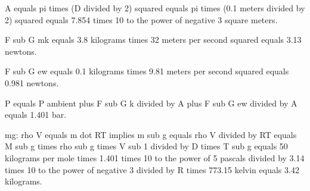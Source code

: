 A equals pi times (D divided by 2) squared equals pi times (0.1 meters divided by 2) squared equals 7.854 times 10 to the power of negative 3 square meters.

F sub G mk equals 3.8 kilograms times 32 meters per second squared equals 3.13 newtons.

F sub G ew equals 0.1 kilograms times 9.81 meters per second squared equals 0.981 newtons.

P equals P ambient plus F sub G k divided by A plus F sub G ew divided by A equals 1.401 bar.

mg: rho V equals m dot RT implies m sub g equals rho V divided by RT equals M sub g times rho sub g times V sub 1 divided by D times T sub g equals 50 kilograms per mole times 1.401 times 10 to the power of 5 pascals divided by 3.14 times 10 to the power of negative 3 divided by R times 773.15 kelvin equals 3.42 kilograms.